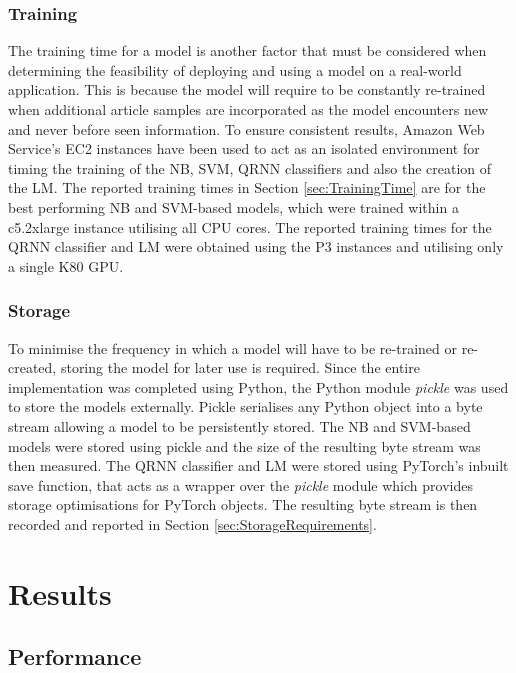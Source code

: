 \documentclass[a4paper,twoside,phd]{BYUPhys}
\begin{document}
\subsection{Training}
\label{sec:TrainingExperiments}
The training time for a model is another factor that must be considered when determining the feasibility of deploying and using a model on a real-world application. This is because the model will require to be constantly re-trained when additional article samples are incorporated as the model encounters new and never before seen information. To ensure consistent results, Amazon Web Service's EC2 instances \cite{AWS} have been used to act as an isolated environment for timing the training of the NB, SVM, QRNN classifiers and also  the creation of the LM. The reported training times in Section \ref{sec:TrainingTime} are for the best performing NB and SVM-based models, which were trained within a c5.2xlarge instance utilising all CPU cores. The reported training times for the QRNN classifier and LM were obtained using the P3 instances and utilising only a single K80 GPU.


\subsection{Storage}
\label{sec:StorageExperiments}
To minimise the frequency in which a model will have to be re-trained or re-created, storing the model for later use is required. Since the entire implementation was completed using Python, the Python module \textit{pickle} was used to store the models externally. Pickle serialises any Python object into a byte stream allowing a model to be persistently stored. The NB and SVM-based models were stored using pickle and the size of the resulting byte stream was then measured. The QRNN classifier and LM were stored using PyTorch's inbuilt save function, that acts as a wrapper over the \textit{pickle} module which provides storage optimisations for PyTorch objects. The resulting byte stream is then recorded and reported in Section \ref{sec:StorageRequirements}.



\chapter{Results}
\label{chap:Results}

\section{Performance}
\label{sec:AccuracyResults}
\end{document}
